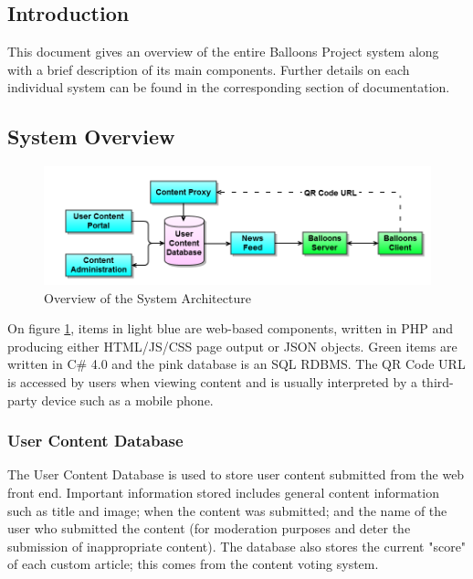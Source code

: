 \subsection{Introduction}
This document gives an overview of the entire Balloons Project system along 
with a brief description of its main components. Further details on each 
individual system can be found in the corresponding section of documentation.

\subsection{System Overview}

\begin{figure}
\begin{centering}
\includegraphics[width=\textwidth]{Diagrams/System-Architecture-Diagram.png}
\par\end{centering}

\caption{Overview of the System Architecture}
\label{Flo:SystemArch}
\end{figure}

On figure \ref{Flo:SystemArch}, items in light blue are web-based components, written in PHP and producing 
either HTML/JS/CSS page output or JSON objects. Green items are written in C\#
4.0 and the pink database is an SQL RDBMS. The QR Code URL is accessed by users
when viewing content and is usually interpreted by a third-party device such as
a mobile phone.

\subsubsection{User Content Database}
The User Content Database is used to store user content submitted from the web
front end. Important information stored includes general content information 
such as title and image; when the content was submitted; and the name of the 
user who submitted the content (for moderation purposes and deter the 
submission of inappropriate content). The database also stores the current 
"score" of each custom article; this comes from the content voting system. 

